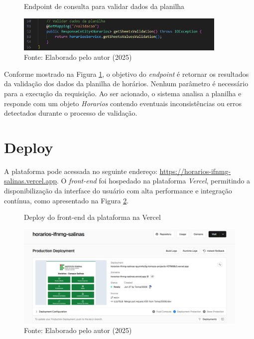 \begin{itemize}
    \begin{figure}[htb]
        \centering
        \caption{Endpoint de consulta para validar dados da planilha}
        \includegraphics[width=0.9\textwidth]{Figuras/back-8.png}
        \caption*{Fonte: Elaborado pelo autor (2025)}
        \label{fig_back_8}
    \end{figure}

    Conforme mostrado na Figura \ref{fig_back_8}, o objetivo do \textit{endpoint} é retornar os resultados da validação dos dados da planilha de horários. Nenhum parâmetro é necessário para a execução da requisição. Ao ser acionado, o sistema analisa a planilha e responde com um objeto \textit{Horarios} contendo eventuais inconsistências ou erros detectados durante o processo de validação.
\end{itemize}

\section{Deploy}

A plataforma pode acessada no seguinte endereço: \url{https://horarios-ifnmg-salinas.vercel.app}. O \textit{front-end} foi hospedado na plataforma \textit{Vercel}, permitindo a disponibilização da interface do usuário com alta performance e integração contínua, como apresentado na Figura \ref{fig_deploy_1}.

\begin{figure}[H]
    \centering
    \caption{Deploy do front-end da plataforma na Vercel}
    \includegraphics[width=1\textwidth]{Figuras/deploy-1.png}
    \caption*{Fonte: Elaborado pelo autor (2025)}
    \label{fig_deploy_1}
\end{figure}

